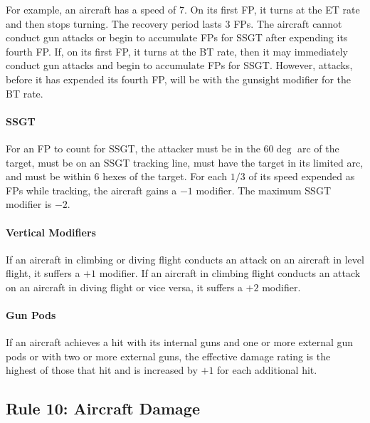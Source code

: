 \documentclass[10pt]{article}
\begin{document}
For example, an aircraft has a speed of 7. On its first FP, it turns at the ET rate and then stops turning. The recovery period lasts 3 FPs. The aircraft cannot conduct gun attacks or begin to accumulate FPs for SSGT after expending its fourth FP. If, on its first FP, it turns at the BT rate, then it may immediately conduct gun attacks and begin to accumulate FPs for SSGT. However, attacks, before it has expended its fourth FP, will be with the gunsight modifier for the BT rate.

\paragraph{SSGT} For an FP to count for SSGT, the attacker must be in the $60\deg$ arc of the target, must be on an SSGT tracking line,  must have the target in its limited arc, and must be within 6 hexes of the target. For each $1/3$ of its speed expended as FPs while tracking, the aircraft gains a $-1$ modifier. The maximum SSGT modifier is $-2$.

\paragraph{Vertical Modifiers} If an aircraft in climbing or diving flight conducts an attack on an aircraft in level flight, it suffers a $+1$ modifier. If an aircraft in climbing flight conducts an attack on an aircraft in diving flight or vice versa, it suffers a $+2$ modifier.

\paragraph{Gun Pods} If an aircraft achieves a hit with its internal guns and one or more external gun pods or with two or more external guns, the effective damage rating is the highest of those that hit and is increased by $+1$ for each additional hit.

\subsection{Rule 10: Aircraft Damage}
\end{document}
